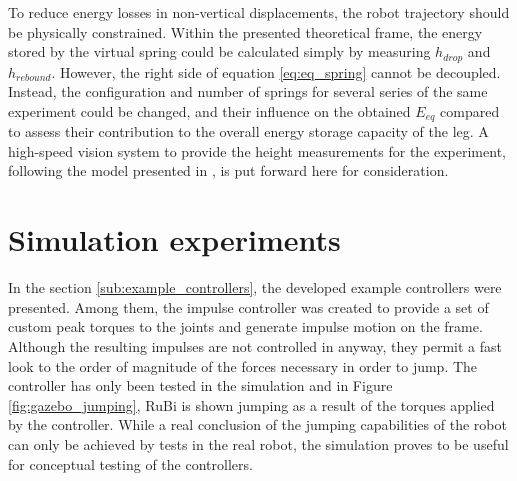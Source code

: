 To reduce energy losses in non-vertical displacements, the robot trajectory should be physically constrained.
Within the presented theoretical frame, the energy stored by the virtual spring could be calculated simply by measuring $h_{drop}$ and $h_{rebound}$.
However, the right side of equation \ref{eq:eq_spring} cannot be decoupled.
Instead, the configuration and number of springs for several series of the same experiment could be changed, and their influence on the obtained $E_{eq}$ compared to assess their contribution to the overall energy storage capacity of the leg.
A high-speed vision system to provide the height measurements for the experiment, following the model presented in \cite{hs_vision}, is put forward here for consideration. 


\section{Simulation experiments} %
\label{sec:simulation_experiments}
In the section \ref{sub:example_controllers}, the developed example controllers were presented.
Among them, the impulse controller was created to provide a set of custom peak torques to the joints and generate impulse motion on the frame.
Although the resulting impulses are not controlled in anyway, they permit a fast look to the order of magnitude of the forces necessary in order to jump.
The controller has only been tested in the simulation and in Figure \ref{fig:gazebo_jumping}, RuBi is shown jumping as a result of the torques applied by the controller.
While a real conclusion of the jumping capabilities of the robot can only be achieved by tests in the real robot, the simulation proves to be useful for conceptual testing of the controllers.



